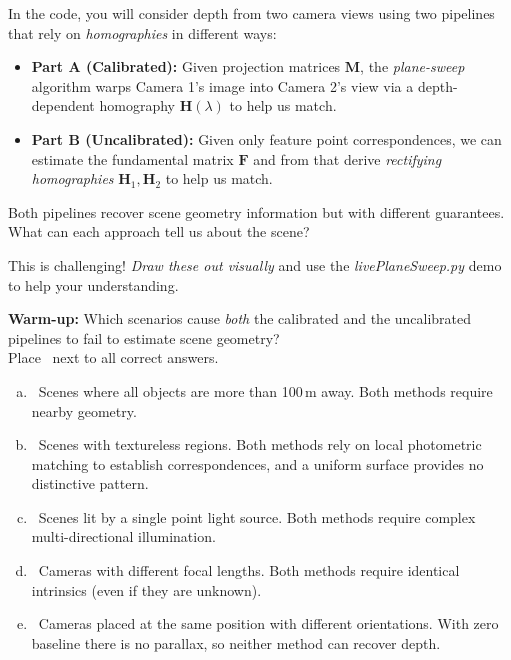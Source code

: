 \documentclass{csci1430}
\begin{document}
\begin{question}[points=14,drawbox=false]
In the code, you will consider depth from two camera views using two pipelines that rely on \emph{homographies} in different ways:

\begin{itemize}[leftmargin=12pt]
    \item \textbf{Part A (Calibrated):} Given projection matrices $\mathbf{M}$, the \emph{plane-sweep} algorithm warps Camera 1's image into Camera 2's view via a depth-dependent homography $\mathbf{H}(\lambda)$ to help us match.
    \item \textbf{Part B (Uncalibrated):} Given only feature point correspondences, we can estimate the fundamental matrix $\mathbf{F}$ and from that derive \emph{rectifying homographies} $\mathbf{H}_1, \mathbf{H}_2$ to help us match.
\end{itemize}
Both pipelines recover scene geometry information but with different guarantees. What can each approach tell us about the scene?

This is challenging! \emph{Draw these out visually} and use the \emph{livePlaneSweep.py} demo to help your understanding.
\end{question}

\begin{subquestion}[points=2]
\textbf{Warm-up:} Which scenarios cause \emph{both} the calibrated and the uncalibrated pipelines to fail to estimate scene geometry? \\
Place \filled~next to all correct answers.
\end{subquestion}

\begin{answer}[height=13]
    \begin{enumerate}[(a),leftmargin=12pt]
    \item \cbox~Scenes where all objects are more than 100\,m away. Both methods require nearby geometry.
    \item \cbox~Scenes with textureless regions. Both methods rely on local photometric matching to establish correspondences, and a uniform surface provides no distinctive pattern.
    \item \cbox~Scenes lit by a single point light source. Both methods require complex multi-directional illumination.
    \item \cbox~Cameras with different focal lengths. Both methods require identical intrinsics (even if they are unknown).
    \item \cbox~Cameras placed at the same position with different orientations. With zero baseline there is no parallax, so neither method can recover depth.
\end{enumerate}
\end{answer}
\end{document}
